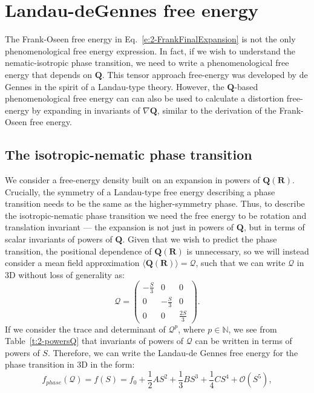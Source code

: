 \section{Landau-deGennes free energy}
The Frank-Oseen free energy in Eq.~\ref{e:2-FrankFinalExpansion} is not the only phenomenological free energy expression.
In fact, if we wish to understand the nematic-isotropic phase transition, we need to write a phenomenological free energy that depends on $\mathbf{Q}$.
This tensor approach free-energy was developed by de Gennes in the spirit of a Landau-type theory.
However, the $\mathbf{Q}$-based phenomenological free energy can can also be used to calculate a distortion free-energy by expanding in invariants of $\nabla \mathbf{Q}$, similar to the derivation of the Frank-Oseen free energy.


\subsection{The isotropic-nematic phase transition}
We consider a free-energy density built on an expansion in powers of $\mathbf{Q}(\mathbf{R})$.
Crucially, the symmetry of a Landau-type free energy describing a phase transition needs to be the same as the higher-symmetry phase.
Thus, to describe the isotropic-nematic phase transition we need the free energy to be rotation and translation invariant --- the expansion is not just in powers of $\mathbf{Q}$, but in terms of scalar invariants of powers of $\mathbf{Q}$.
Given that we wish to predict the phase transition, the positional dependence of $\mathbf{Q}(\mathbf{R})$ is unnecessary, so we will instead consider a mean field approximation $\langle \mathbf{Q}(\mathbf{R}) \rangle = \bm{\mathcal{Q}}$, such that we can write $\bm{\mathcal{Q}}$ in 3D without loss of generality as:
\begin{equation}
  \bm{\mathcal{Q}} =
    \begin{pmatrix}
        -\frac{S}{3} & 0 & 0 \\
        0 & -\frac{S}{3} & 0 \\
        0 & 0 & \frac{2S}{3}
    \end{pmatrix}.
\end{equation}
If we consider the trace and determinant of $\bm{\mathcal{Q}}^p$, where $p \in \mathbb{N}$, we see from Table~\ref{t:2-powersQ} that invariants of powers of $\bm{\mathcal{Q}}$ can be written in terms of powers of $S$.
Therefore, we can write the Landau-de Gennes free energy for the phase transition in 3D in the form:
\begin{equation}
  f_{phase}(\bm{\mathcal{Q}}) = f(S) = f_0 + \frac{1}{2}A S^2 + \frac{1}{3}B S^3 + \frac{1}{4}C S^4 + \mathcal{O} \left (S^5 \right ),\label{e:2-LdGTransGeneral}
\end{equation}
